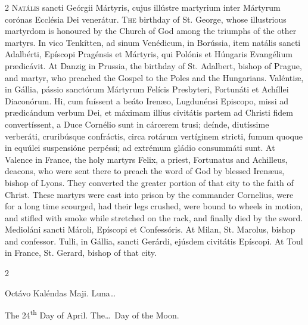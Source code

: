 \begin{paracol}{2}
\lettrine[lines=2]{N}{atális} sancti Geórgii 
 Mártyris, cujus illústre martyrium inter Mártyrum corónas Ecclésia Dei 
 venerátur.
\switchcolumn
{}
\lettrine[lines=2]{T}{he} birthday of St. George, whose 
 illustrious martyrdom is honoured by the Church of God among the triumphs of 
 the other martyrs.
\switchcolumn*
{}
In vico Tenkítten, ad 
 sinum Venédicum, in Borússia, item natális sancti Adalbérti, Epíscopi 
 Pragénsis et Mártyris, qui Polónis et Húngaris Evangélium prædicávit.
\switchcolumn
{}
At Danzig in Prussia, the birthday 
 of St. Adalbert, bishop of Prague, and martyr, who preached the Gospel to 
 the Poles and the Hungarians.
\switchcolumn*
{}
Valéntiæ, in Gállia, 
 pássio sanctórum Mártyrum Felícis Presbyteri, Fortunáti et Achíllei 
 Diaconórum. Hi, cum fuíssent a beáto Irenæo, Lugdunénsi Episcopo, 
 missi ad prædicándum verbum Dei, et máximam illíus civitátis partem ad 
 Christi fidem convertíssent, a Duce Cornélio sunt in cárcerem trusi; deínde, 
 diutíssime verberáti, cruribúsque confráctis, circa rotárum vertíginem 
 stricti, fumum quoque in equúlei suspensióne perpéssi; ad extrémum gládio 
 consummáti sunt.
\switchcolumn
{}
At Valence in France, the holy 
 martyrs Felix, a priest, Fortunatus and Achilleus, deacons, who were sent 
 there to preach the word of God by blessed Irenæus, bishop of Lyons. 
 They converted the greater portion of that city to the faith of Christ. 
 These martyrs were cast into prison by the commander Cornelius, were for a 
 long time scourged, had their legs crushed, were bound to wheels in motion, 
 and stifled with smoke while stretched on the rack, and finally died by the 
 sword.
\switchcolumn*
{}
Medioláni sancti 
 Mároli, Epíscopi et Confessóris.
\switchcolumn
{}
At Milan, St. Marolus, bishop and 
 confessor.
\switchcolumn*
{}
Tulli, in Gállia, 
 sancti Gerárdi, ejúsdem civitátis Epíscopi.
\switchcolumn
{}
At Toul in France, St. Gerard, 
 bishop of that city.
\switchcolumn*
{}
\end{paracol}


\begin{paracol}{2}
\begin{center}{\color{gregoriocolor} Octávo Kaléndas Maji. 
 Luna\dots\ }\end{center}
\switchcolumn
{}
\begin{center}{\color{gregoriocolor} The 24\textsuperscript{th} Day of April. The\dots\ 
 Day of the Moon.}\end{center}
\end{paracol}

